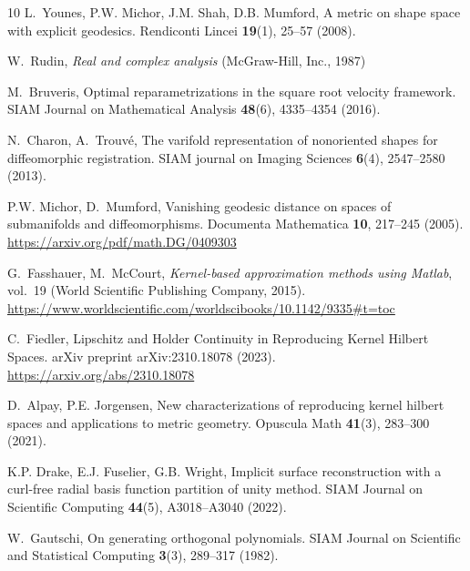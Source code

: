 \documentclass[pdflatex,iicol]{sn-jnl}%
\theoremstyle{thmstyleone}%
\theoremstyle{thmstyletwo}%
\theoremstyle{thmstylethree}%
\begin{document}
\begin{thebibliography}{10}
L.~Younes, P.W. Michor, J.M. Shah, D.B. Mumford, A metric on shape space with explicit geodesics.
\newblock Rendiconti Lincei \textbf{19}(1), 25--57 (2008).
\newblock {}

W.~Rudin, \emph{Real and complex analysis} (McGraw-Hill, Inc., 1987)

M.~Bruveris, Optimal reparametrizations in the square root velocity framework.
\newblock SIAM Journal on Mathematical Analysis \textbf{48}(6), 4335--4354 (2016).
\newblock {}

N.~Charon, A.~Trouv{\'e}, The varifold representation of nonoriented shapes for diffeomorphic registration.
\newblock SIAM journal on Imaging Sciences \textbf{6}(4), 2547--2580 (2013).
\newblock {}

P.W. Michor, D.~Mumford, Vanishing geodesic distance on spaces of submanifolds and diffeomorphisms.
\newblock Documenta Mathematica \textbf{10}, 217--245 (2005).
\newblock \urlprefix\url{https://arxiv.org/pdf/math.DG/0409303}

G.~Fasshauer, M.~McCourt, \emph{Kernel-based approximation methods using {M}atlab}, vol.~19 (World Scientific Publishing Company, 2015).
\newblock \urlprefix\url{https://www.worldscientific.com/worldscibooks/10.1142/9335#t=toc}

C.~Fiedler, {Lipschitz and Holder Continuity in Reproducing Kernel Hilbert Spaces}.
\newblock arXiv preprint arXiv:2310.18078  (2023).
\newblock \urlprefix\url{https://arxiv.org/abs/2310.18078}

D.~Alpay, P.E. Jorgensen, New characterizations of reproducing kernel hilbert spaces and applications to metric geometry.
\newblock Opuscula Math \textbf{41}(3), 283--300 (2021).
\newblock {}

K.P. Drake, E.J. Fuselier, G.B. Wright, Implicit surface reconstruction with a curl-free radial basis function partition of unity method.
\newblock SIAM Journal on Scientific Computing \textbf{44}(5), A3018--A3040 (2022).
\newblock {}

W.~Gautschi, On generating orthogonal polynomials.
\newblock SIAM Journal on Scientific and Statistical Computing \textbf{3}(3), 289--317 (1982).
\newblock {}


\end{thebibliography}
\end{document}
